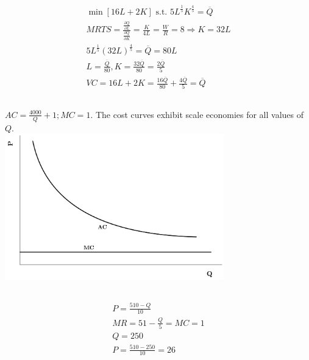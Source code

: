 \documentclass{article}
\begin{document}
\section[8]{}
	\subsection[a]{}
		\begin{align*}
			\min[16L+2K]\textrm{ s.t. }5L^\frac{1}{5} K^\frac{4}{5} = \overline{Q}\\
			MRTS = \frac{\frac{\partial Q}{\partial L}}{\frac{\partial Q}{\partial K}} = \frac{K}{4L}=\frac{W}{R} = 8 \Rightarrow K = 32L\\
			5L^\frac{1}{5}(32L)^\frac{4}{5} = \overline{Q} = 80L \\
			L = \frac{\overline{Q}}{80}, K=\frac{32\overline{Q}}{80} = \frac{2\overline{Q}}{5} \\
			VC = 16L+2K = \frac{16\overline{Q}}{80} + \frac{4\overline{Q}}{5} = \overline{Q}
		\end{align*}
	\subsection[b]{}
		$AC = \frac{4000}{Q}+1; MC = 1.$ The cost curves exhibit scale economies for all values of $Q$.\\
		\includegraphics[height=2.5in]{Charts/8b}
	\subsection[c]{}
		\begin{align*}
			P = \frac{510-Q}{10} \\
			MR = 51- \frac{Q}{5} = MC = 1\\
			Q = 250\\
			P= \frac{510-250}{10}=26
		\end{align*}
	
\end{document}
